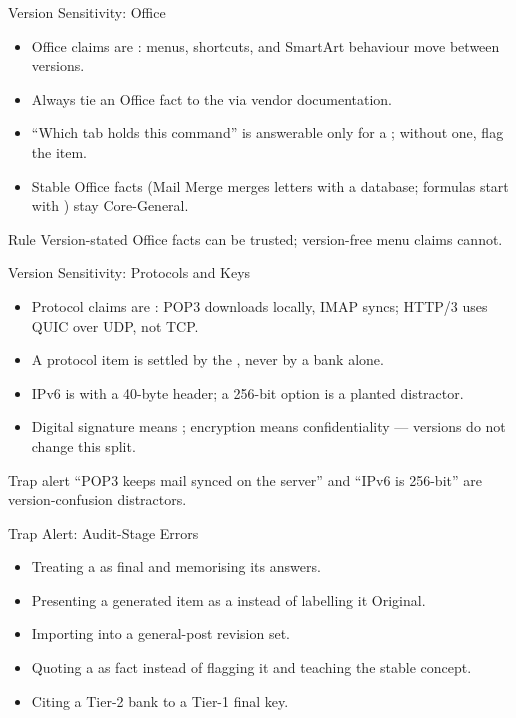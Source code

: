\documentclass[aspectratio=169]{beamer}
\begin{document}
\begin{frame}{Version Sensitivity: Office}
  \begin{itemize}
    \item Office claims are : menus, shortcuts, and SmartArt behaviour move between versions.
    \item Always tie an Office fact to the  via vendor documentation.
    \item ``Which tab holds this command'' is answerable only for a ; without one, flag the item.
    \item Stable Office facts (Mail Merge merges letters with a database; formulas start with \key{=}) stay Core-General.
  \end{itemize}
  \begin{block}{Rule}
    Version-stated Office facts can be trusted; version-free menu claims cannot.
  \end{block}
\end{frame}

\begin{frame}{Version Sensitivity: Protocols and Keys}
  \begin{itemize}
    \item Protocol claims are : POP3 downloads locally, IMAP syncs; HTTP/3 uses QUIC over UDP, not TCP.
    \item A protocol item is settled by the , never by a bank alone.
    \item IPv6 is  with a 40-byte header; a 256-bit option is a planted distractor.
    \item Digital signature means ; encryption means confidentiality --- versions do not change this split.
  \end{itemize}
  \begin{alertblock}{Trap alert}
    ``POP3 keeps mail synced on the server'' and ``IPv6 is 256-bit'' are version-confusion distractors.
  \end{alertblock}
\end{frame}

\begin{frame}{Trap Alert: Audit-Stage Errors}
  \begin{itemize}
    \item Treating a  as final and memorising its answers.
    \item Presenting a generated item as a  instead of labelling it Original.
    \item Importing  into a general-post revision set.
    \item Quoting a  as fact instead of flagging it and teaching the stable concept.
    \item Citing a Tier-2 bank to  a Tier-1 final key.
  \end{itemize}
\end{frame}
\end{document}
